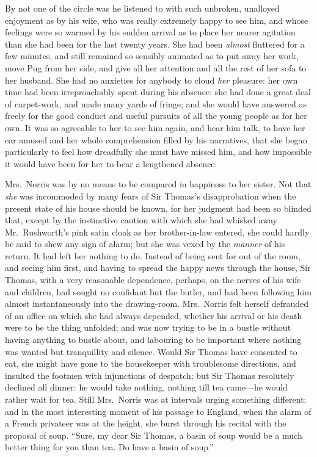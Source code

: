 By not one of the circle was he listened to with such unbroken,
unalloyed enjoyment as by his wife, who was really
extremely happy to see him, and whose feelings were
so warmed by his sudden arrival as to place her nearer
agitation than she had been for the last twenty years.
She had been \emph{almost} fluttered for a few minutes,
and still remained so sensibly animated as to put away
her work, move Pug from her side, and give all her
attention and all the rest of her sofa to her husband.
She had no anxieties for anybody to cloud \emph{her} pleasure:
her own time had been irreproachably spent during his absence:
she had done a great deal of carpet-work, and made many
yards of fringe; and she would have answered as freely
for the good conduct and useful pursuits of all the young
people as for her own.  It was so agreeable to her to see
him again, and hear him talk, to have her ear amused
and her whole comprehension filled by his narratives,
that she began particularly to feel how dreadfully she
must have missed him, and how impossible it would have
been for her to bear a lengthened absence.

Mrs.\ Norris was by no means to be compared in happiness
to her sister.  Not that \emph{she} was incommoded by many
fears of Sir Thomas's disapprobation when the present
state of his house should be known, for her judgment
had been so blinded that, except by the instinctive
caution with which she had whisked away Mr.\ Rushworth's
pink satin cloak as her brother-in-law entered,
she could hardly be said to shew any sign of alarm;
but she was vexed by the \emph{manner} of his return.
It had left her nothing to do.  Instead of being sent
for out of the room, and seeing him first, and having
to spread the happy news through the house, Sir Thomas,
with a very reasonable dependence, perhaps, on the nerves
of his wife and children, had sought no confidant but
the butler, and had been following him almost instantaneously
into the drawing-room. Mrs.\ Norris felt herself defrauded
of an office on which she had always depended, whether his
arrival or his death were to be the thing unfolded;
and was now trying to be in a bustle without having
anything to bustle about, and labouring to be important
where nothing was wanted but tranquillity and silence.
Would Sir Thomas have consented to eat, she might have gone
to the housekeeper with troublesome directions, and insulted
the footmen with injunctions of despatch; but Sir Thomas
resolutely declined all dinner:  he would take nothing,
nothing till tea came---he would rather wait for tea.
Still Mrs.\ Norris was at intervals urging something different;
and in the most interesting moment of his passage to England,
when the alarm of a French privateer was at the height,
she burst through his recital with the proposal of soup.
``Sure, my dear Sir Thomas, a basin of soup would be
a much better thing for you than tea.  Do have a basin
of soup.''

